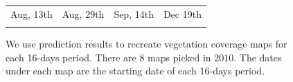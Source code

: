 \documentclass[10pt,journal,compsoc]{IEEEtran}
\begin{document}
\begin{figure}
\begin{center}
\begin{tabular}{cccc}
Aug, 13th&Aug, 29th&Sep, 14th&Dec 19th\\
\\
\end{tabular}
\end{center}
\vspace{-24pt}
\caption{%
We use prediction results to recreate vegetation coverage maps for each 16-days period. There are 8 maps picked in 2010. The dates under each map are the starting date of each 16-days period.}
\label{fig:map}
\vspace{-12pt}
\end{figure}
%
%
%
%
%
\end{document}

